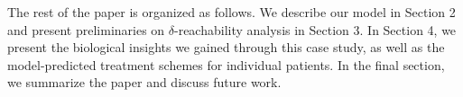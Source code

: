 %
%
%
%


The rest of the paper is organized as follows. We describe our model in Section 2 and present preliminaries on $\delta$-reachability analysis in Section 3. In Section 4, we present the biological insights we gained through this case study, as well as the model-predicted treatment schemes for individual patients. In the final section, we summarize the paper and discuss future work.
